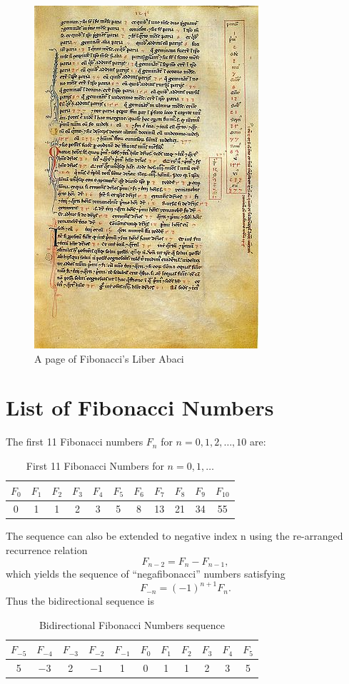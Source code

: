 \begin{figure}[hbt!]
\centering
\includegraphics[width=.4\textwidth]{314px-Liber-abbaci-magliab-f124r}
\caption{A page of Fibonacci's Liber Abaci}
\end{figure}

\section{List of Fibonacci Numbers}

The first 11 Fibonacci numbers $F_n$ for $n = 0, 1, 2, \ldots, 10$ are:

\begin{table}[hbt!]\centering
\caption{First 11 Fibonacci Numbers for $n=0,1,\ldots$}
\begin{tabular}{|c|c|c|c|c|c|c|c|c|c|c|}
\hline
$F_0$ & $F_1$ & $F_2$ & $F_3$ & $F_4$ & $F_5$ & $F_6$ & $F_7$ & $F_8$ & $F_9$ & $F_{10}$\\
\hline
0 & 1 & 1 & 2 & 3 & 5 & 8 & 13 & 21 & 34 & 55 \\
\hline
\end{tabular}
\end{table}

The sequence can also be extended to negative index n using the re-arranged recurrence relation
%
\begin{equation}
F_{n-2} = F_n - F_{n-1},
\end{equation}
%
which yields the sequence of ``negafibonacci'' numbers satisfying
%
\begin{equation}
F_{-n} = (-1)^{n+1} F_n.
\end{equation}
%
Thus the bidirectional sequence is
\begin{table}[hbt!]\centering
\caption{Bidirectional Fibonacci Numbers sequence}
\begin{tabular}{|c|c|c|c|c|c|c|c|c|c|c|}
\hline
$F_{-5}$ & $F_{-4}$ & $F_{-3}$ & $F_{-2}$ & $F_{-1}$ & $F_0$ & $F_1$ & $F_2$ & $F_3$ & $F_4$ & $F_5$ \\\hline
5 & $-3$ & 2 & $-1$ & 1 & 0 & 1 & 1 & 2 & 3 & 5\\\hline
\end{tabular}
\end{table}

